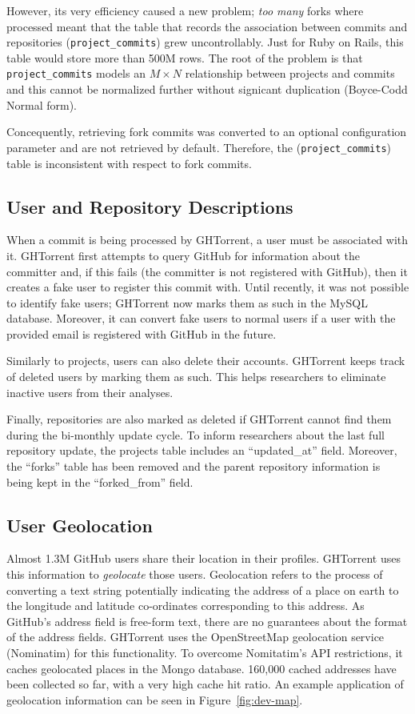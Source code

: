 \documentclass{sig-alternate}
\begin{document}
However, its very efficiency caused a new problem; \emph{too many} forks where
processed meant that the table that records the association between commits and
repositories (\texttt{project\_\-commits}) grew uncontrollably. Just for Ruby on
Rails, this table would store more than 500M rows. The root of the problem
is that \texttt{project\_commits} models an $M \times N$ relationship between
projects and commits and this cannot be normalized further without signicant
duplication (Boyce-Codd Normal form).

Concequently, retrieving fork commits was converted to an optional
configuration parameter and are not retrieved by default. Therefore, the
(\texttt{project\_\-commits}) table is inconsistent with respect to
fork commits.

\subsection{User and Repository Descriptions}

When a commit is being processed by GHTorrent, a user must be associated with it.
GHTorrent first attempts to query GitHub for information about the committer
and, if this fails (the committer is not registered with GitHub), then it
creates a fake user to register this commit with. Until recently, it was not
possible to identify fake users; GHTorrent now marks them as such in the MySQL
database. Moreover, it can convert fake users to normal users if a user with
the provided email is registered with GitHub in the future.

Similarly to projects, users can also delete their accounts.
GHTorrent keeps track of deleted users by marking them as such. This helps
researchers to eliminate inactive users from their analyses.

Finally, repositories are also marked as deleted if GHTorrent cannot find
them during the bi-monthly update cycle. To inform researchers about the
last full repository update, the projects table includes an ``updated\_at''
field. Moreover, the ``forks'' table has been removed and the parent
repository information is being kept in the ``forked\_\-from'' field.

\subsection{User Geolocation}

Almost 1.3M GitHub users share their location in their profiles. GHTorrent uses
this information to \emph{geolocate} those users. Geolocation refers to the
process of converting a text string potentially indicating the address of a
place on earth to the longitude and latitude co-ordinates corresponding to this
address. As GitHub's address field is free-form text, there are no guarantees
about the format of the address fields. GHTorrent uses the OpenStreetMap
geolocation service (Nominatim) for this functionality. To overcome Nomitatim's
API restrictions, it caches geolocated places in the Mongo database. 160,000
cached addresses have been collected so far, with a very high cache hit ratio.
An example application of geolocation information can be seen in
Figure~\ref{fig:dev-map}.
\end{document}
